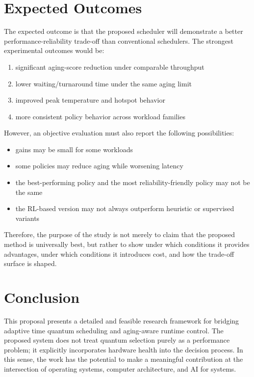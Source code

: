 \documentclass[12pt,a4paper]{article}
\begin{document}
\section{Expected Outcomes}

The expected outcome is that the proposed scheduler will demonstrate a better performance-reliability trade-off
than conventional schedulers. The strongest experimental outcomes would be:

\begin{enumerate}[leftmargin=*]
\item significant aging-score reduction under comparable throughput
\item lower waiting/turnaround time under the same aging limit
\item improved peak temperature and hotspot behavior
\item more consistent policy behavior across workload families
\end{enumerate}

However, an objective evaluation must also report the following possibilities:

\begin{itemize}[leftmargin=*]
\item gains may be small for some workloads
\item some policies may reduce aging while worsening latency
\item the best-performing policy and the most reliability-friendly policy may not be the same
\item the RL-based version may not always outperform heuristic or supervised variants
\end{itemize}

Therefore, the purpose of the study is not merely to claim that the proposed method is universally best, but rather to
show under which conditions it provides advantages, under which conditions it introduces cost, and how the trade-off
surface is shaped.

\section{Conclusion}

This proposal presents a detailed and feasible research framework for bridging adaptive time quantum scheduling and
aging-aware runtime control. The proposed system does not treat quantum selection purely as a performance problem;
it explicitly incorporates hardware health into the decision process. In this sense, the work has the potential to
make a meaningful contribution at the intersection of operating systems, computer architecture, and AI for systems.
\end{document}
